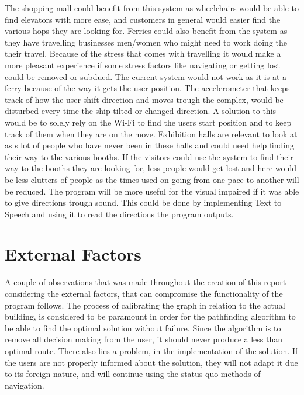The shopping mall could benefit from this system as wheelchairs would be able to find elevators with more ease, and customers in general would easier find the various hops they are looking for. Ferries could also benefit from the system as they have travelling businesses men/women who might need to work doing the their travel. Because of the stress that comes with travelling\cite{future_stress} it would make a more pleasant experience if some stress factors like navigating or getting lost could be removed or subdued. The current system would not work as it is at a ferry because of the way it gets the user position. The accelerometer that keeps track of how the user shift direction and moves trough the complex, would be disturbed every time the ship tilted or changed direction. A solution to this would be to solely rely on the Wi-Fi to find the users start position and to keep track of them when they are on the move. Exhibition halls are relevant to look at as s lot of people who have never been in these halls and could need help finding their way to the various booths. If the visitors could use the system to find their way to the booths they are looking for, less people would get lost and here would be less clutters of people as the times used on going from one pace to another will be reduced. 
\newline 
The program will be more useful for the visual impaired if it was able to give directions trough sound. This could be done by implementing Text to Speech\cite{diss_tss} and using it to read the directions the program outputs.

\section{External Factors}

A couple of observations that was made throughout the creation of this report considering the external factors, that can compromise the functionality of the program follows. The process of calibrating the graph in relation to the actual building, is considered to be paramount in order for the pathfinding algorithm to be able to find the optimal solution without failure. Since the algorithm is to remove all decision making from the user, it should never produce a less than optimal route. There also lies a problem, in the implementation of the solution. If the users are not properly informed about the solution, they will not adapt it due to its foreign nature, and will continue using the status quo methods of navigation.